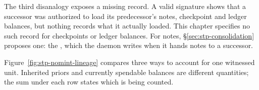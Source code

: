 \documentclass[11pt,a4paper]{article}
\theoremstyle{definition}
\begin{document}
\begin{pdboundary}
The third disanalogy exposes a missing record. A valid signature shows that a
successor was authorized to load its predecessor's notes, checkpoint and ledger
balances, but nothing records what it actually loaded. This chapter specifies
no such record for checkpoints or ledger balances. For notes,
\S\ref{sec:stp-consolidation} proposes one: the , which the
daemon writes when it hands notes to a successor.
\end{pdboundary}

\pdexercisepointer*{\ref{ex:stp-connected-vs-continuous}}{\ref{ex:stp-fork-inheritance}}{\pageref{ex:stp-connected-vs-continuous}}

Figure~\ref{fig:stp-nomint-lineage} compares three ways to account for one
witnessed unit. Inherited priors and currently spendable balances are different
quantities; the sum under each row states which is being counted.


\FloatBarrier
\pdmarginpagebreak
\end{document}
